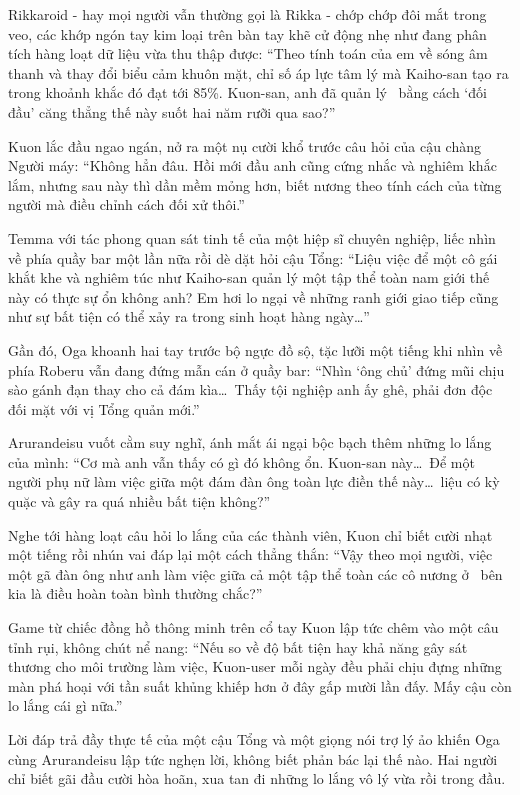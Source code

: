 \documentclass[../main.tex]{subfiles}
\begin{document}
Rikkaroid - hay mọi người vẫn thường gọi là Rikka - chớp chớp đôi mắt trong veo, các khớp ngón tay kim loại trên bàn tay khẽ cử động nhẹ như đang phân tích hàng loạt dữ liệu vừa thu thập được: ``Theo tính toán của em về sóng âm thanh và thay đổi biểu cảm khuôn mặt, chỉ số áp lực tâm lý mà Kaiho-san tạo ra trong khoảnh khắc đó đạt tới 85\%. Kuon-san, anh đã quản lý \hll\ bằng cách `đối đầu' căng thẳng thế này suốt hai năm rưỡi qua sao?''

Kuon lắc đầu ngao ngán, nở ra một nụ cười khổ trước câu hỏi của cậu chàng Người máy: ``Không hẳn đâu. Hồi mới đầu anh cũng cứng nhắc và nghiêm khắc lắm, nhưng sau này thì dần mềm mỏng hơn, biết nương theo tính cách của từng người mà điều chỉnh cách đối xử thôi.''

Temma với tác phong quan sát tinh tế của một hiệp sĩ chuyên nghiệp, liếc nhìn về phía quầy bar một lần nữa rồi dè dặt hỏi cậu Tổng: ``Liệu việc để một cô gái khắt khe và nghiêm túc như Kaiho-san quản lý một tập thể toàn nam giới thế này có thực sự ổn không anh? Em hơi lo ngại về những ranh giới giao tiếp cũng như sự bất tiện có thể xảy ra trong sinh hoạt hàng ngày\dots''

Gần đó, Oga khoanh hai tay trước bộ ngực đồ sộ, tặc lưỡi một tiếng khi nhìn về phía Roberu vẫn đang đứng mẫn cán ở quầy bar: ``Nhìn `ông chủ' đứng mũi chịu sào gánh đạn thay cho cả đám kìa\dots\ Thấy tội nghiệp anh ấy ghê, phải đơn độc đối mặt với vị Tổng quản mới.''

Arurandeisu vuốt cằm suy nghĩ, ánh mắt ái ngại bộc bạch thêm những lo lắng của mình: ``Cơ mà anh vẫn thấy có gì đó không ổn. Kuon-san này\dots\ Để một người phụ nữ làm việc giữa một đám đàn ông toàn lực điền thế này\dots\ liệu có kỳ quặc và gây ra quá nhiều bất tiện không?''

Nghe tới hàng loạt câu hỏi lo lắng của các thành viên, Kuon chỉ biết cười nhạt một tiếng rồi nhún vai đáp lại một cách thẳng thắn: ``Vậy theo mọi người, việc một gã đàn ông như anh làm việc giữa cả một tập thể toàn các cô nương ở \hll\ bên kia là điều hoàn toàn bình thường chắc?''

Game từ chiếc đồng hồ thông minh trên cổ tay Kuon lập tức chêm vào một câu tỉnh rụi, không chút nể nang: ``Nếu so về độ bất tiện hay khả năng gây sát thương cho môi trường làm việc, Kuon-user mỗi ngày đều phải chịu đựng những màn phá hoại với tần suất khủng khiếp hơn ở đây gấp mười lần đấy. Mấy cậu còn lo lắng cái gì nữa.''

Lời đáp trả đầy thực tế của một cậu Tổng và một giọng nói trợ lý ảo khiến Oga cùng Arurandeisu lập tức nghẹn lời, không biết phản bác lại thế nào. Hai người chỉ biết gãi đầu cười hòa hoãn, xua tan đi những lo lắng vô lý vừa rồi trong đầu.
\end{document}
